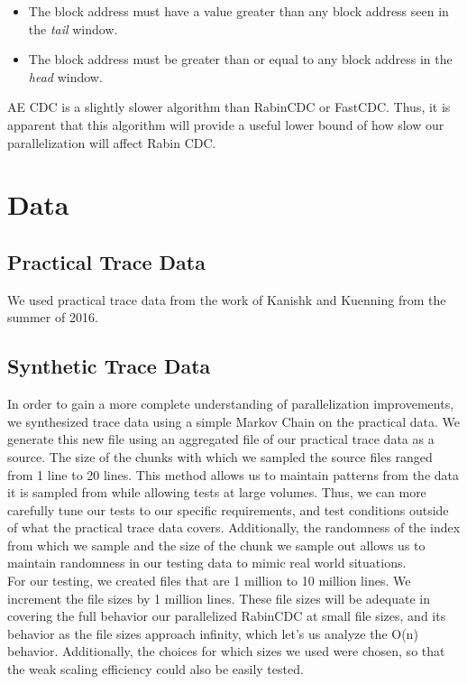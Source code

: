 \documentclass{acmtog} %
\begin{document}
	\begin{itemize}
	\item The block address must have a value greater than any block address seen in the \textit{tail} window.
	\item The block address must be greater than or equal to any block address in the \textit{head} window.
	\end{itemize}
	
	AE CDC is a slightly slower algorithm than RabinCDC or FastCDC. Thus, it is apparent that this algorithm will provide a useful lower bound of how slow our parallelization will affect Rabin CDC.

	\section{Data}
	\subsection{Practical Trace Data}
	We used practical trace data from the work of Kanishk and Kuenning from the summer of 2016. \\
	\subsection{Synthetic Trace Data}
	In order to gain a more complete understanding of parallelization improvements, we synthesized trace data using a simple Markov Chain on the practical data. We generate this new file using an aggregated file of our practical trace data as a source. The size of the chunks with which we sampled the source files ranged from 1 line to 20 lines. This method allows us to maintain patterns from the data it is sampled from while allowing tests at large volumes. Thus, we can more carefully tune our tests to our specific requirements, and test conditions outside of what the practical trace data covers. Additionally, the randomness of the index from which we sample and the size of the chunk we sample out allows us to maintain randomness in our testing data to mimic real world situations.\\
	
	For our testing, we created files that are 1 million to 10 million lines. We increment the file sizes by 1 million lines. These file sizes will be adequate in covering the full behavior our parallelized RabinCDC at small file sizes, and its behavior as the file sizes approach infinity, which let's us analyze the O(n) behavior. Additionally, the choices for which sizes we used were chosen, so that the weak scaling efficiency could also be easily tested.
	
\end{document}
